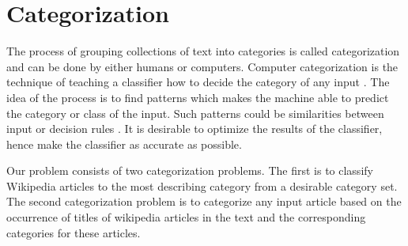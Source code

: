 \section{Categorization}
The process of grouping collections of text into categories is called categorization and can be done by either humans or computers. Computer categorization is the technique of teaching a classifier how to decide the category of any input \cite{wiki:categorization}. The idea of the process is to find patterns which makes the machine able to predict the category or class of the input. Such patterns could be similarities between input or decision rules \cite{wiki:classification}. It is desirable to optimize the results of the classifier, hence make the classifier as accurate as possible. 



Our problem consists of two categorization problems. The first is to classify Wikipedia articles to the most describing category from a desirable category set. The second categorization problem is to categorize any input article based on the occurrence of titles of wikipedia articles in the text and the corresponding categories for these articles. 

